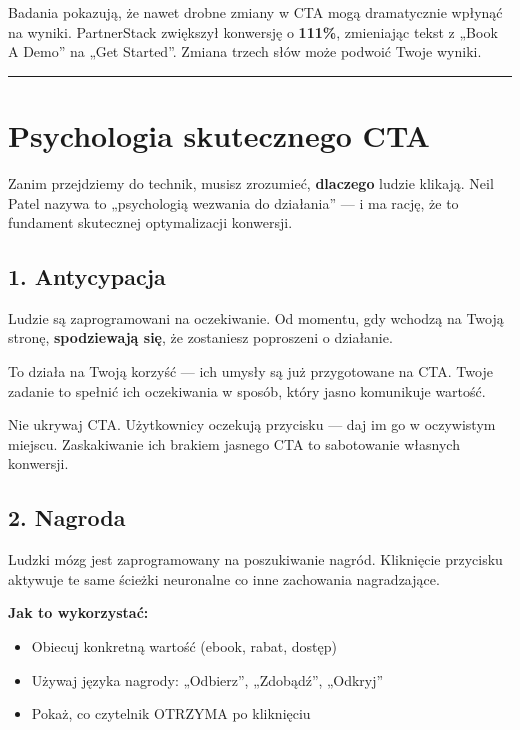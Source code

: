 \documentclass[
  12pt,
  a4paper,
  twoside,
  openright,
  12pt,
  DIV=12,
  BCOR=12mm]{scrbook}
\providecommand{\tightlist}{%
  \setlength{\itemsep}{0pt}\setlength{\parskip}{0pt}}\usepackage{longtable,booktabs,array}
\newcommand{\decoline}{%
  \begin{center}
    \textcolor{bordergray}{\rule{0.3\textwidth}{0.5pt}}
  \end{center}
}
\begin{document}
Badania pokazują, że nawet drobne zmiany w CTA mogą dramatycznie wpłynąć
na wyniki. PartnerStack zwiększył konwersję o \textbf{111\%}, zmieniając
tekst z „Book A Demo'' na „Get Started''. Zmiana trzech słów może
podwoić Twoje wyniki.

\decoline

\section{Psychologia skutecznego CTA}\label{psychologia-skutecznego-cta}

Zanim przejdziemy do technik, musisz zrozumieć, \textbf{dlaczego} ludzie
klikają. Neil Patel nazywa to „psychologią wezwania do działania'' --- i
ma rację, że to fundament skutecznej optymalizacji konwersji.

\subsection{1. Antycypacja}\label{antycypacja}

Ludzie są zaprogramowani na oczekiwanie. Od momentu, gdy wchodzą na
Twoją stronę, \textbf{spodziewają się}, że zostaniesz poproszeni o
działanie.

To działa na Twoją korzyść --- ich umysły są już przygotowane na CTA.
Twoje zadanie to spełnić ich oczekiwania w sposób, który jasno
komunikuje wartość.

\begin{wskazowka}
Nie ukrywaj CTA. Użytkownicy oczekują przycisku --- daj im go w oczywistym miejscu. Zaskakiwanie ich brakiem jasnego CTA to sabotowanie własnych konwersji.
\end{wskazowka}

\subsection{2. Nagroda}\label{nagroda}

Ludzki mózg jest zaprogramowany na poszukiwanie nagród. Kliknięcie
przycisku aktywuje te same ścieżki neuronalne co inne zachowania
nagradzające.

\textbf{Jak to wykorzystać:}

\begin{itemize}
\tightlist
\item
  Obiecuj konkretną wartość (ebook, rabat, dostęp)
\item
  Używaj języka nagrody: „Odbierz'', „Zdobądź'', „Odkryj''
\item
  Pokaż, co czytelnik OTRZYMA po kliknięciu
\end{itemize}
\end{document}
